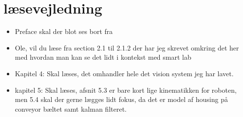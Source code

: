 \section{læsevejledning}
\begin{itemize}
  \item Preface skal der blot ses bort fra
  \item Ole, vil du læse fra section 2.1 til 2.1.2 der har jeg skrevet omkring det her med hvordan man kan se det lidt i kontekst med smart lab
  \item Kapitel 4: Skal læses, det omhandler hele det vision system jeg har lavet.
  \item kapitel 5: Skal læses, afsnit 5.3 er bare kort lige kinematikken for roboten, men 5.4 skal der gerne lægges lidt fokus, da det er model af housing på conveyor bæltet samt kalman filteret. 

\end{itemize}


